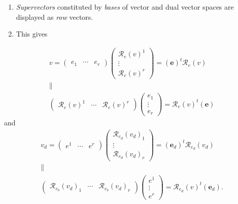 \documentclass[aps,preprint]{revtex4}
\begin{document}
\begin{enumerate}
\item \emph{Supervectors} constituted by \emph{bases }of vector and dual
vector spaces are displayed as \emph{row }vectors.

\item This gives
\end{enumerate}

\begin{gather}
v=\left( 
\begin{array}{ccc}
e_{1} & \cdots  & e_{r}%
\end{array}%
\right) \left( 
\begin{array}{c}
\mathcal{R}_{e}\left( v\right) ^{1} \\ 
\vdots  \\ 
\mathcal{R}_{e}\left( v\right) ^{r}%
\end{array}%
\right) =\left( \boldsymbol{e}\right) ^{t}\mathcal{R}_{e}\left( v\right)  \\
\parallel  \\
\left( 
\begin{array}{ccc}
\mathcal{R}_{e}\left( v\right) ^{1} & \cdots  & \mathcal{R}_{e}\left(
v\right) ^{r}%
\end{array}%
\right) \left( 
\begin{array}{c}
e_{1} \\ 
\vdots  \\ 
e_{r}%
\end{array}%
\right) =\mathcal{R}_{e}\left( v\right) ^{t}\left( \boldsymbol{e}\right) 
\end{gather}%
and 
\begin{gather}
v_{d}=\left( 
\begin{array}{ccc}
e^{1} & \cdots  & e^{r}%
\end{array}%
\right) \left( 
\begin{array}{c}
\mathcal{R}_{e_{d}}\left( v_{d}\right) _{1} \\ 
\vdots  \\ 
\mathcal{R}_{e_{d}}\left( v_{d}\right) _{r}%
\end{array}%
\right) =\left( \boldsymbol{e}_{d}\right) ^{t}\mathcal{R}_{e_{d}}\left(
v_{d}\right)  \\
\parallel  \\
\left( 
\begin{array}{ccc}
\mathcal{R}_{e_{b}}\left( v_{d}\right) _{1} & \cdots  & \mathcal{R}%
_{e_{b}}\left( v_{d}\right) _{r}%
\end{array}%
\right) \left( 
\begin{array}{c}
e^{1} \\ 
\vdots  \\ 
e^{r}%
\end{array}%
\right) =\mathcal{R}_{e_{d}}\left( v\right) ^{t}\left( \boldsymbol{e}%
_{d}\right) .
\end{gather}
\end{document}
